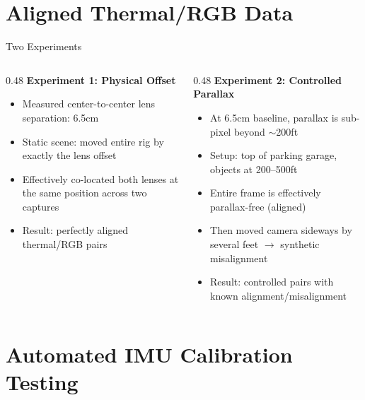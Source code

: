 \documentclass[10pt, aspectratio=169]{beamer}
\begin{document}
\section{Aligned Thermal/RGB Data}

\begin{frame}{Two Experiments}
  \begin{columns}[T]
    \begin{column}{0.48\textwidth}
      \textbf{Experiment 1: Physical Offset}
      \begin{itemize}
        \item Measured center-to-center lens separation: 6.5cm
        \item Static scene: moved entire rig by exactly the lens offset
        \item Effectively co-located both lenses at the same position across two captures
        \item Result: perfectly aligned thermal/RGB pairs
      \end{itemize}
    \end{column}
    \begin{column}{0.48\textwidth}
      \textbf{Experiment 2: Controlled Parallax}
      \begin{itemize}
        \item At 6.5cm baseline, parallax is sub-pixel beyond $\sim$200ft
        \item Setup: top of parking garage, objects at 200--500ft
        \item Entire frame is effectively parallax-free (aligned)
        \item Then moved camera sideways by several feet $\rightarrow$ synthetic misalignment
        \item Result: controlled pairs with known alignment/misalignment
      \end{itemize}
    \end{column}
  \end{columns}
\end{frame}

\section{Automated IMU Calibration Testing}
\end{document}

